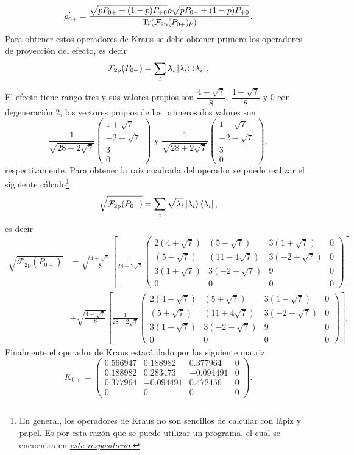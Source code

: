 \[\rho'_{0+}=\dfrac{\sqrt{p P_{0+}+(1-p)P_{+0}}\rho\sqrt{p P_{0+}+(1-p)P_{+0} }}{{\rm Tr}(\mathcal{F}_{2\text{p}}(P_{0+})\rho)}.\]  Para obtener estos operadores de Kraus se debe obtener primero los operadores de proyección del efecto, es decir \[\mathcal{F}_{2\text{p}}(P_{0+})= \sum_i \lambda_i \ket{\lambda_i}\bra{\lambda_i},\] El efecto tiene rango tres y sus valores propios son $\dfrac{4+\sqrt{7}}{8}$, $\dfrac{4-\sqrt{7}}{8}$ y $0$ con degeneración 2,  los vectores propios de los primeros dos valores son\[\frac{1}{\sqrt{28 - 2 \sqrt{7} }}\begin{pmatrix}1 + \sqrt{7}\\-2 + \sqrt{7}\\ 3\\0 \end{pmatrix} \text{ y } \frac{1}{\sqrt{28 + 2 \sqrt{7} }}\begin{pmatrix}1 - \sqrt{7}\\-2 - \sqrt{7}\\ 3\\0 \end{pmatrix},\] respectivamente. Para obtener la raíz cuadrada del operador se puede realizar el siguiente cálculo\footnote{En general, los operadores de Kraus no son sencillos de calcular con lápiz y papel. Es por esta razón que se puede utilizar un programa, el cual se encuentra en \href{https://github.com/Mohs9/Practicas_Tesis/blob/bca73a98e2a7a5e3020436e42fcb1ebec38831cb/Tesis/Code/descripcion2particulas.py}{\textit{este respositorio} }} \[\sqrt{\mathcal{F}_{2\text{p}}(P_{0+})}=\sum_i \sqrt{\lambda_i} \ket{\lambda_i}\bra{\lambda_i},\] es decir \[\begin{split}\sqrt{\mathcal{F}_{2\text{p}}(P_{0+})}&=\sqrt{\frac{4+\sqrt{7}}{8}} \left[\frac{1}{28-2\sqrt{7}} \begin{pmatrix}
    2(4+\sqrt{7}) & (5-\sqrt{7}) &  3(1+\sqrt{7}) &  0\\
    (5-\sqrt{7}) &  (11-4\sqrt{7}) &  3(-2+\sqrt{7}) &  0\\
    3(1+\sqrt{7})  &  3(-2+\sqrt{7})  &  9 &  0\\
    0&  0&  0&  0
  \end{pmatrix}\right]\\&+ \sqrt{\frac{4-\sqrt{7}}{8}}\left[ \frac{1}{28+2\sqrt{7}} \begin{pmatrix}
    2(4-\sqrt{7}) & (5+\sqrt{7}) &  3(1-\sqrt{7}) &  0\\
    (5+\sqrt{7}) &  (11+4\sqrt{7}) &  3(-2-\sqrt{7}) &  0\\
    3(1+\sqrt{7})  &  3(-2-\sqrt{7})  &  9 &  0\\
    0&  0&  0&  0
  \end{pmatrix}\right]. \end{split}\]Finalmente el operador de Kraus estará dado por las siguiente matriz \[K_{0+}=\begin{pmatrix}
    0.566947& 0.188982& 0.377964& 0\\
    0.188982 &  0.283473& -0.094491 &  0\\
    0.377964 & -0.094491  &  0.472456 &  0\\
    0 &  0&  0 &  0
  \end{pmatrix}.\] 

